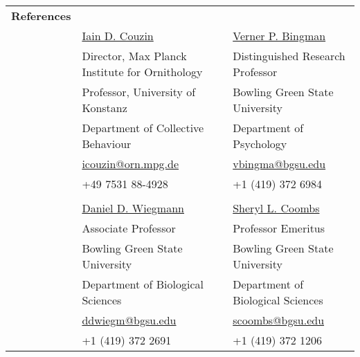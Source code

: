\documentclass[letterpaper,10pt,oneside]{article}
\begin{document}
\noindent \begin{longtable}{@{} l l l}
 \Large{\textbf{References}} \vspace{5mm} \\
 & \href{http://www.collectivebehaviour.com/couzin}{Iain D. Couzin} & \href{https://www.bgsu.edu/arts-and-sciences/biological-sciences/faculty-and-staff/alphabetical-listing/verner-bingman.html}{Verner P. Bingman} \\
 & Director, Max Planck Institute for Ornithology &  Distinguished Research Professor  \\
 & Professor, University of Konstanz &  Bowling Green State University \\
 & Department of Collective Behaviour  & Department of Psychology \\
 & \small{\href{mailto:icouzin@orn.mpg.de}{icouzin@orn.mpg.de}} & \small{\href{mailto:vbingma@bgsu.edu}{vbingma@bgsu.edu}} \\
 &\small{+49 7531 88-4928} & \small{+1 (419) 372 6984} \\
&& \\
  & \href{https://www.bgsu.edu/arts-and-sciences/biological-sciences/faculty-and-staff/alphabetical-listing/daniel-wiegmann.html}{Daniel D. Wiegmann} & \href{https://www.bgsu.edu/arts-and-sciences/neuroscience/nmb-people/faculty/sheryl-coombs.html}{Sheryl L. Coombs} \\
 & Associate Professor  &  Professor Emeritus \\
 & Bowling Green State University & Bowling Green State University \\
 & Department of Biological Sciences  & Department of Biological Sciences \\
 & \small{\href{mailto:ddwiegm@bgsu.edu}{ddwiegm@bgsu.edu}} & \small{\href{mailto:scoombs@bgsu.edu}{scoombs@bgsu.edu}} \\
 &\small{+1 (419) 372 2691} & \small{+1 (419) 372 1206} \\
 
\end{longtable}


\end{document}
